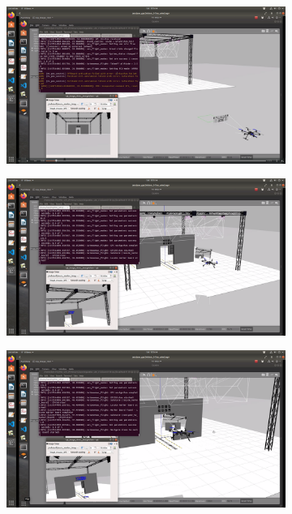 \documentclass[../Head/report.tex]{subfiles}
\begin{document}
\begin{figure}[H]
    \centering
    \begin{subfigure}[t]{.30\textwidth}
        \centering
        \includegraphics[width=\textwidth]{../Figures/GPS2Vision/drone_start_pose_gps.png}
        \caption{}
        \label{fig:gps2vision_gps}
    \end{subfigure}
     \hspace{0.2em}
    \begin{subfigure}[t]{.30\textwidth}
        \centering
        \includegraphics[width=\textwidth]{../Figures/GPS2Vision/drone_locate_board.png}
        \caption{}
        \label{fig:gps2vision_locate_board}
    \end{subfigure}
         \hspace{0.2em}
    \begin{subfigure}[t]{.30\textwidth}
        \centering
        \includegraphics[width=\textwidth]{../Figures/GPS2Vision/drone_navigate_to_board.png}

\end{subfigure}
\end{figure}
\end{document}
